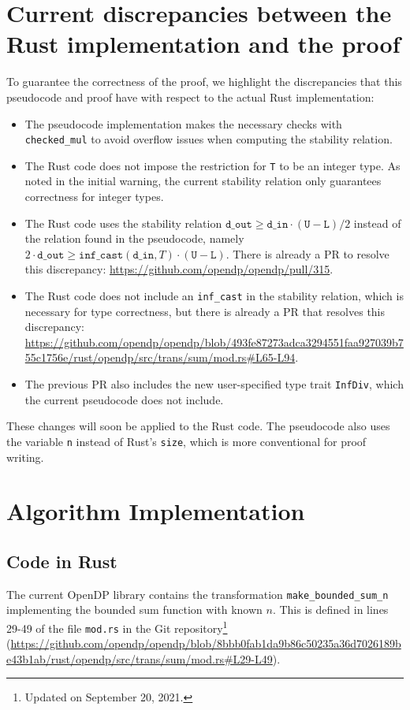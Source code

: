 \documentclass[11pt,a4paper]{article}
\theoremstyle{definition}
\newcommand{\din}{\texttt{d\_in}}
\newcommand{\dout}{\texttt{d\_out}}
\begin{document}
\section{Current discrepancies between the Rust implementation and the proof}

To guarantee the correctness of the proof, we highlight the discrepancies that this pseudocode and proof have with respect to the actual Rust implementation:
\begin{itemize}
    \item The pseudocode implementation makes the necessary checks with \texttt{checked\_mul} to avoid overflow issues when computing the stability relation. 
    \item The Rust code does not impose the restriction for \texttt{T} to be an integer type. As noted in the initial warning, the current stability relation only guarantees correctness for integer types.
    \item The Rust code uses the stability relation $\dout \geq \din \cdot (\texttt{U}-\texttt{L})/2$ instead of the relation found in the pseudocode, namely $2\cdot \dout \geq \texttt{inf\_cast}(\din, T)\cdot (\texttt{U}-\texttt{L})$. There is already a PR to resolve this discrepancy: \url{https://github.com/opendp/opendp/pull/315}.
    \item The Rust code does not include an \texttt{inf\_cast} in the stability relation, which is necessary for type correctness, but there is already a PR that resolves this discrepancy: \url{https://github.com/opendp/opendp/blob/493fe87273adca3294551faa927039b755c1756e/rust/opendp/src/trans/sum/mod.rs#L65-L94}.
    \item The previous PR also includes the new user-specified type trait \texttt{InfDiv}, which the current pseudocode does not include.
\end{itemize}

These changes will soon be applied to the Rust code. The pseudocode also uses the variable \texttt{n} instead of Rust's \texttt{size}, which is more conventional for proof writing.


\section{Algorithm Implementation}
\subsection{Code in Rust}
The current OpenDP library contains the transformation \texttt{make\_bounded\_sum\_n} implementing the bounded sum function with known $n$. This is defined in lines 29-49 of the file \texttt{mod.rs} in the Git repository\footnote{Updated on September 20, 2021.} (\url{https://github.com/opendp/opendp/blob/8bbb0fab1da9b86c50235a36d7026189be43b1ab/rust/opendp/src/trans/sum/mod.rs#L29-L49}).
\end{document}

